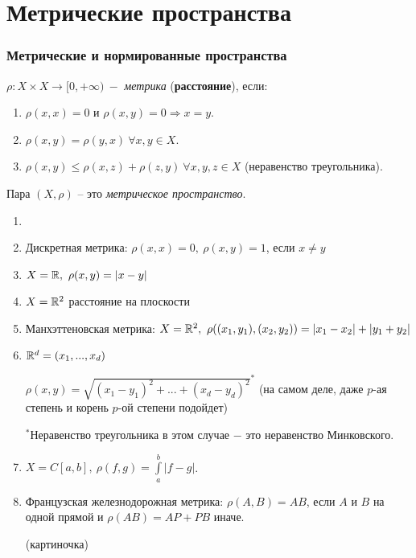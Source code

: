 \part{Метрические пространства}
\section{Метрические и нормированные пространства}

\begin{definition}
    \item $\rho:X\times X\rightarrow [0,+\infty)\ -$ \textit{метрика} (\textbf{расстояние}), если:
    \begin{enumerate}
        \item $\rho(x,x)=0$ и $\rho(x,y)=0\Rightarrow x=y$.
        \item $\rho(x,y)=\rho(y,x)\ \forall x,y\in X$.
        \item $\rho(x,y)\leq \rho(x,z) + \rho(z,y)\ \forall x,y,z\in X$ (неравенство треугольника).
    \end{enumerate}
\end{definition}

\begin{definition}
    Пара $(X,\rho)$ – это \textit{метрическое пространство}.
\end{definition}

\begin{example}
    \begin{enumerate}
        \item[]
        \item Дискретная метрика: $\rho(x,x)=0,\ \rho(x,y)=1$, если $x\neq y$
        \item $X=\R,\ \rho(x,y)=|x-y|$
        \item $X=\mathbb{R}^2$ расстояние на плоскости
        \item Манхэттеновская метрика: $X=\R^2,\ \rho((x_1, y_1), (x_2, y_2))=|x_1-x_2|+|y_1+y_2|$
        \item $\mathbb{R}^d=(x_1,...,x_d)$

        $\rho(x,y)=\sqrt{(x_1-y_1)^2+...+(x_d-y_d)^2}^*$ (на самом деле, даже $p$-ая степень и корень $p$-ой степени подойдет)

        $^*$Неравенство треугольника в этом случае $-$ это неравенство Минковского.
        \item $X=C[a,b],\ \rho(f,g)=\int\limits_a^b |f-g|$.
        \item Французская железнодорожная метрика: $\rho(A,B)=AB$, если $A$ и $B$ на одной прямой и $\rho(AB)=AP+PB$ иначе.

        (картиночка)
    \end{enumerate}
\end{example}

